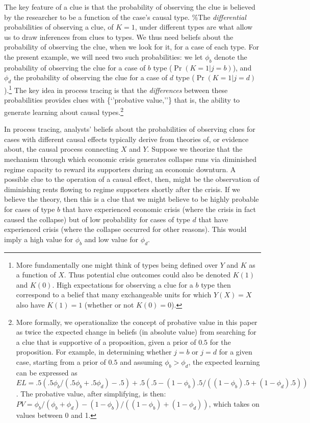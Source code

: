 \documentclass[12pt,]{book}
\let\rmarkdownfootnote\footnote%
\def\footnote{\protect\rmarkdownfootnote}
\begin{document}
The key feature of a clue is that the probability of observing the clue is believed by the researcher to be a function of the case's causal type. \%The \emph{differential} probabilities of observing a clue, of \(K=1\), under different types are what allow us to draw inferences from clues to types. We thus need beliefs about the probability of observing the clue, when we look for it, for a case of each type.
For the present example, we will need two such probabilities: we let \(\phi_b\) denote the probability of observing the clue for a case of \(b\) type (\(\Pr(K=1|j=b)\)), and \(\phi_d\) the probability of observing the clue for a case of \(d\) type (\(\Pr(K=1|j=d)\)).\footnote{More fundamentally one might think of types being defined over \(Y\) and \(K\) as a function of \(X\). Thus potential clue outcomes could also be denoted \(K(1)\) and \(K(0)\). High expectations for observing a clue for a \(b\) type then correspond to a belief that many exchangeable units for which \(Y(X)=X\) also have \(K(1)=1\) (whether or not \(K(0)=0\)).} The key idea in process tracing is that the \emph{differences} between these probabilities provides clues with \{`'probative value,''\} that is, the ability to generate learning about causal types.\footnote{\label{fnPV}More formally, we operationalize the concept of probative value in this paper as twice the expected change in beliefs (in absolute value) from searching for a clue that is supportive of a proposition, given a prior of \(0.5\) for the proposition. For example, in determining whether \(j=b\) or \(j=d\) for a given case, starting from a prior of \(0.5\) and assuming \(\phi_b > \phi_d\), the expected learning can be expressed as \(EL = .5(.5\phi_b/(.5\phi_b + .5\phi_d) -.5) +.5 (.5 - (1-\phi_b).5/((1-\phi_b).5 + (1-\phi_d).5))\). The probative value, after simplifying, is then: \(PV = \phi_b/(\phi_b + \phi_d) -(1-\phi_b)/((1-\phi_b) + (1-\phi_d))\), which takes on values between 0 and 1.}

In process tracing, analysts' beliefs about the probabilities of observing clues for cases with different causal effects typically derive from theories of, or evidence about, the causal process connecting \(X\) and \(Y\). Suppose we theorize that the mechanism through which economic crisis generates collapse runs via diminished regime capacity to reward its supporters during an economic downturn. A possible clue to the operation of a causal effect, then, might be the observation of diminishing rents flowing to regime supporters shortly after the crisis. If we believe the theory, then this is a clue that we might believe to be highly probable for cases of type \(b\) that have experienced economic crisis (where the crisis in fact caused the collapse) but of low probability for cases of type \(d\) that have experienced crisis (where the collapse occurred for other reasons). This would imply a high value for \(\phi_b\) and low value for \(\phi_d\).
\end{document}
